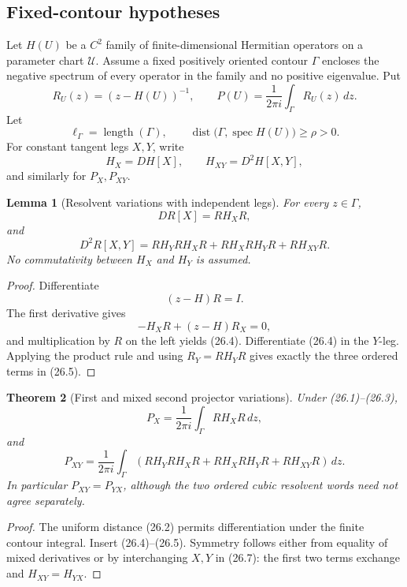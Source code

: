 \documentclass[11pt]{article}
\newtheorem{theorem}{Theorem}[section]
\newtheorem{lemma}[theorem]{Lemma}
\begin{document}
\subsection{Fixed-contour hypotheses}

Let \(H(U)\) be a \(C^2\) family of finite-dimensional Hermitian
operators on a parameter chart \(\mathcal U\).  Assume a fixed positively
oriented contour \(\Gamma\) encloses the negative spectrum of every
operator in the family and no positive eigenvalue.  Put
\[
 R_U(z)=(z-H(U))^{-1},\qquad
 P(U)=\frac1{2\pi i}\int_\Gamma R_U(z)\,dz.
 \tag{26.1}
\]
Let
\[
 \ell_\Gamma=\operatorname{length}(\Gamma),\qquad
 \operatorname{dist}\bigl(\Gamma,\operatorname{spec}H(U)\bigr)
 \geq\rho>0.
 \tag{26.2}
\]
For constant tangent legs \(X,Y\), write
\[
 H_X=D H[ X],\qquad H_{XY}=D^2H[X,Y],
 \tag{26.3}
\]
and similarly for \(P_X,P_{XY}\).

\begin{lemma}[Resolvent variations with independent legs]
\label{lem:v11v26-resolvent}
For every \(z\in\Gamma\),
\[
 D R[X]=R H_X R,
 \tag{26.4}
\]
and
\[
 D^2R[X,Y]
 =
 R H_Y R H_X R
 +R H_X R H_Y R
 +R H_{XY}R.
 \tag{26.5}
\]
No commutativity between \(H_X\) and \(H_Y\) is assumed.
\end{lemma}

\begin{proof}
Differentiate
\[
 (z-H)R=I.
\]
The first derivative gives
\[
 -H_XR+(z-H)R_X=0,
\]
and multiplication by \(R\) on the left yields (26.4).
Differentiate (26.4) in the \(Y\)-leg.  Applying the product rule and
using \(R_Y=RH_YR\) gives exactly the three ordered terms in (26.5).
\end{proof}

\begin{theorem}[First and mixed second projector variations]
\label{thm:v11v26-projector-variations}
Under (26.1)--(26.3),
\[
 P_X
 =
 \frac1{2\pi i}\int_\Gamma R H_XR\,dz,
 \tag{26.6}
\]
and
\[
 P_{XY}
 =
 \frac1{2\pi i}\int_\Gamma
 \left(
 RH_YRH_XR+RH_XRH_YR+RH_{XY}R
 \right)\,dz.
 \tag{26.7}
\]
In particular \(P_{XY}=P_{YX}\), although the two ordered cubic
resolvent words need not agree separately.
\end{theorem}

\begin{proof}
The uniform distance (26.2) permits differentiation under the finite
contour integral.  Insert (26.4)--(26.5).  Symmetry follows either from
equality of mixed derivatives or by interchanging \(X,Y\) in (26.7):
the first two terms exchange and \(H_{XY}=H_{YX}\).
\end{proof}
\end{document}
